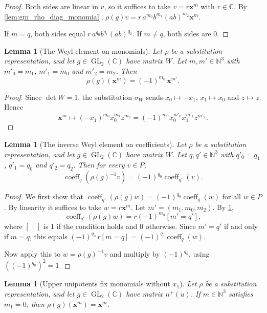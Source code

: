 \documentclass[11pt]{article}
\newtheorem{lemma}[theorem]{Lemma}
\theoremstyle{definition}
\theoremstyle{remark}
\newcommand{\CC}{\mathbb{C}}
\newcommand{\NN}{\mathbb{N}}
\DeclareMathOperator{\GL}{GL}
\DeclareMathOperator{\coeff}{coeff}
\begin{document}
\begin{proof}
Both sides are linear in $v$, so it suffices to take $v=r\mathbf x^m$ with $r\in\CC$. By \cref{lem:gm_rho_diag_monomial}, $\rho(g)v=r\,a^{m_0}b^{m_1}(ab)^{m_2}\mathbf x^m$.

If $m=q$, both sides equal $r\,a^{q_0}b^{q_1}(ab)^{q_2}$. If $m\ne q$, both sides are $0$.
\end{proof}

\begin{lemma}[The Weyl element on monomials]\label{lem:gm_rho_W_monomial}
Let $\rho$ be a substitution representation, and let $g\in\GL_2(\CC)$ have matrix $W$. Let $m,m'\in\NN^3$ with $m'_0=m_1$, $m'_1=m_0$ and $m'_2=m_2$. Then
\[
\rho(g)(\mathbf x^m)=(-1)^{m_0}\,\mathbf x^{m'} .
\]
\end{lemma}

\begin{proof}
Since $\det W=1$, the substitution $\sigma_W$ sends $x_0\mapsto -x_1$, $x_1\mapsto x_0$ and $z\mapsto z$. Hence
\[
\mathbf x^m\mapsto (-x_1)^{m_0}x_0^{m_1}z^{m_2}=(-1)^{m_0}x_0^{m'_0}x_1^{m'_1}z^{m'_2}.
\]
\end{proof}

\begin{lemma}[The inverse Weyl element on coefficients]\label{lem:gm_coeff_rho_W_inv}
Let $\rho$ be a substitution representation, and let $g\in\GL_2(\CC)$ have matrix $W$. Let $q,q'\in\NN^3$ with $q'_0=q_1$, $q'_1=q_0$ and $q'_2=q_2$. Then for every $v\in P$,
\[
\coeff_q(\rho(g)^{-1}v)=(-1)^{q_0}\coeff_{q'}(v).
\]
\end{lemma}

\begin{proof}
We first show that $\coeff_{q'}(\rho(g)w)=(-1)^{q_0}\coeff_q(w)$ for all $w\in P$. By linearity it suffices to take $w=r\mathbf x^m$. Let $m'=(m_1,m_0,m_2)$. By \cref{lem:gm_rho_W_monomial},
\[
\coeff_{q'}(\rho(g)w)=r(-1)^{m_0}[m'=q'],
\]
where $[\,\cdot\,]$ is $1$ if the condition holds and $0$ otherwise. Since $m'=q'$ if and only if $m=q$, this equals $(-1)^{q_0}\,r[m=q]=(-1)^{q_0}\coeff_q(w)$.

Now apply this to $w=\rho(g)^{-1}v$ and multiply by $(-1)^{q_0}$, using $((-1)^{q_0})^2=1$.
\end{proof}

\begin{lemma}[Upper unipotents fix monomials without $x_1$]\label{lem:gm_rho_ux_monomial}
Let $\rho$ be a substitution representation, and let $g\in\GL_2(\CC)$ have matrix $n^+(u)$. If $m\in\NN^3$ satisfies $m_1=0$, then $\rho(g)(\mathbf x^m)=\mathbf x^m$.
\end{lemma}
\end{document}
